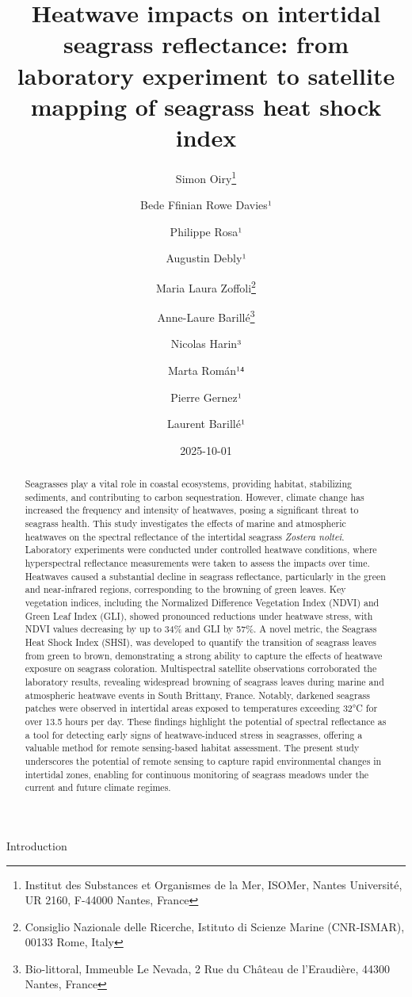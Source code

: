 \documentclass[
  letterpaper,
  DIV=11,
  numbers=noendperiod]{scrartcl}
\title{Heatwave impacts on intertidal seagrass reflectance: from
laboratory experiment to satellite mapping of seagrass heat shock index}
\author{Simon Oiry\footnote{Institut des Substances et Organismes de la
  Mer, ISOMer, Nantes Université, UR 2160, F-44000 Nantes, France} \and Bede
Ffinian Rowe Davies¹ \and Philippe Rosa¹ \and Augustin Debly¹ \and Maria
Laura Zoffoli\footnote{Consiglio Nazionale delle Ricerche, Istituto di
  Scienze Marine (CNR-ISMAR), 00133 Rome, Italy} \and Anne-Laure
Barillé\footnote{Bio-littoral, Immeuble Le Nevada, 2 Rue du Château de
  l'Eraudière, 44300 Nantes, France} \and Nicolas Harin³ \and Marta
Román¹⁴ \and Pierre Gernez¹ \and Laurent Barillé¹}
\date{2025-10-01}
\begin{document}
\maketitle
\begin{abstract}
Seagrasses play a vital role in coastal ecosystems, providing habitat,
stabilizing sediments, and contributing to carbon sequestration.
However, climate change has increased the frequency and intensity of
heatwaves, posing a significant threat to seagrass health. This study
investigates the effects of marine and atmospheric heatwaves on the
spectral reflectance of the intertidal seagrass \emph{Zostera noltei}.
Laboratory experiments were conducted under controlled heatwave
conditions, where hyperspectral reflectance measurements were taken to
assess the impacts over time. Heatwaves caused a substantial decline in
seagrass reflectance, particularly in the green and near-infrared
regions, corresponding to the browning of green leaves. Key vegetation
indices, including the Normalized Difference Vegetation Index (NDVI) and
Green Leaf Index (GLI), showed pronounced reductions under heatwave
stress, with NDVI values decreasing by up to 34\% and GLI by 57\%. A
novel metric, the Seagrass Heat Shock Index (SHSI), was developed to
quantify the transition of seagrass leaves from green to brown,
demonstrating a strong ability to capture the effects of heatwave
exposure on seagrass coloration. Multispectral satellite observations
corroborated the laboratory results, revealing widespread browning of
seagrass leaves during marine and atmospheric heatwave events in South
Brittany, France. Notably, darkened seagrass patches were observed in
intertidal areas exposed to temperatures exceeding 32°C for over 13.5
hours per day. These findings highlight the potential of spectral
reflectance as a tool for detecting early signs of heatwave-induced
stress in seagrasses, offering a valuable method for remote
sensing-based habitat assessment. The present study underscores the
potential of remote sensing to capture rapid environmental changes in
intertidal zones, enabling for continuous monitoring of seagrass meadows
under the current and future climate regimes.
\end{abstract}


Introduction
\end{document}
